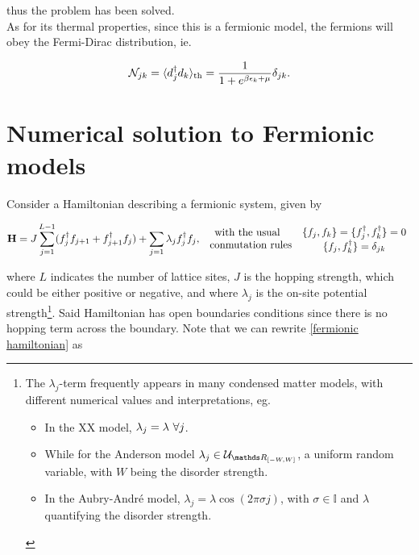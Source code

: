 \documentclass{homework}
\begin{document}
thus the problem has been solved. \\

As for its thermal properties, since this is a fermionic model, the fermions will obey the Fermi-Dirac distribution, ie. 

\begin{equation}
    \mathcal{N}_{jk} = \langle d_j^\dagger d_k \rangle_{\textnormal{th}} =  \frac{1}{1+e^{\beta \epsilon_k + \mu}} \delta_{jk}.
\end{equation}

\clearpage

\section{Numerical solution to Fermionic models}

Consider a Hamiltonian describing a fermionic system, given by 

\begin{equation}
    {\bf H} = J \sum_{j=1}^{L-1} (f_{j}^{\dagger}f_{j+1} + f_{j+1}^{\dagger}f_{j}) + \sum_{j=1} \lambda_j f_{j}^{\dagger} f_j, \begin{array}{c}
         \textnormal{with the usual } \\
         \textnormal{ conmutation rules} 
    \end{array}
    \begin{array}{c}
         \{f_j, f_k\} = \{f_j^\dagger, f_k^\dagger\} = 0  \\
         \{f_j, f_k^\dagger\} = \delta_{jk}
    \end{array}
    \label{fermionic hamiltonian}
\end{equation}

where $L$ indicates the number of lattice sites, $J$ is the hopping strength, which could be either positive or negative, and where $\lambda_j$ is the on-site potential strength\footnote{The $\lambda_j$-term frequently appears in many condensed matter models, with different numerical values and interpretations, eg.

\begin{itemize}
    \item In the XX model, $\lambda_j = \lambda \textnormal{ } \forall j$. 
    \item While for the Anderson model $\lambda_j \in \mathcal{U}_{\R_{[-W, W]}}$, a uniform random variable, with $W$ being the disorder strength. 
    \item In the Aubry-André model, $\lambda_j = \lambda \cos(2\pi\sigma j)$, with $\sigma \in \mathds{I}$ and $\lambda$ quantifying the disorder strength. 
\end{itemize}}. Said Hamiltonian has open boundaries conditions since there is no hopping term across the boundary. Note that we can rewrite \eqref{fermionic hamiltonian} as 
\end{document}
